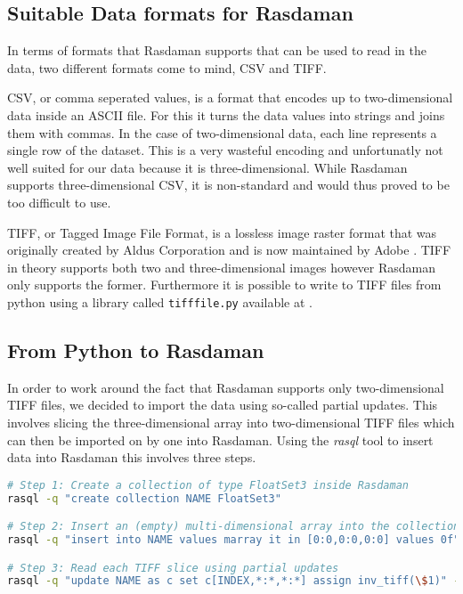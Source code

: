 \subsection{Suitable Data formats for Rasdaman}

In terms of formats that Rasdaman supports that can be used to read in the data, two different formats come to mind, CSV and TIFF. 

CSV, or comma seperated values, is a format that encodes up to two-dimensional data inside an ASCII file. For this it turns the data values into strings and joins them with commas. In the case of two-dimensional data, each line represents a single row of the dataset. This is a very wasteful encoding and unfortunatly not well suited for our data because it is three-dimensional. While Rasdaman supports three-dimensional CSV, it is non-standard and would thus proved to be too difficult to use. 

TIFF, or Tagged Image File Format, is a lossless image raster format that was originally created by Aldus Corporation and is now maintained by Adobe \cite{tiff:website}. TIFF in theory supports both two and three-dimensional images however Rasdaman only supports the former. Furthermore it is possible to write to TIFF files from python using a library called \lstinline{tifffile.py} available at \cite{tifffile:website}. 

\subsection{From Python to Rasdaman}

In order to work around the fact that Rasdaman supports only two-dimensional TIFF files, we decided to import the data using so-called partial updates. This involves slicing the three-dimensional array into two-dimensional TIFF files which can then be imported on by one into Rasdaman. Using the \textit{rasql} tool to insert data into Rasdaman this involves three steps. 

\begin{lstlisting}[showstringspaces=false,morekeywords={NAME},language=Bash]
# Step 1: Create a collection of type FloatSet3 inside Rasdaman
rasql -q "create collection NAME FloatSet3"

# Step 2: Insert an (empty) multi-dimensional array into the collection
rasql -q "insert into NAME values marray it in [0:0,0:0,0:0] values 0f"

# Step 3: Read each TIFF slice using partial updates
rasql -q "update NAME as c set c[INDEX,*:*,*:*] assign inv_tiff(\$1)" --file FILENAME.tiff
\end{lstlisting}

